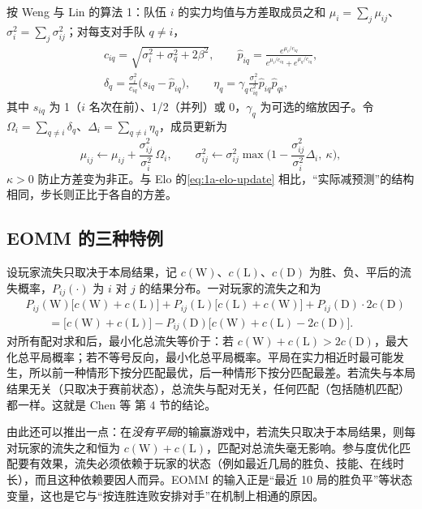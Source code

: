 按 Weng 与 Lin 的算法 1\cite{weng2011bayesian}：队伍 $i$ 的实力均值与方差取成员之和 $\mu_i=\sum_j\mu_{ij}$、$\sigma_i^2=\sum_j\sigma_{ij}^2$；对每支对手队 $q\ne i$，
\begin{gather*}
  c_{iq}=\sqrt{\sigma_i^2+\sigma_q^2+2\beta^2},\qquad
  \hat p_{iq}=\frac{e^{\mu_i/c_{iq}}}{e^{\mu_i/c_{iq}}+e^{\mu_q/c_{iq}}},\\
  \delta_q=\frac{\sigma_i^2}{c_{iq}}\big(s_{iq}-\hat p_{iq}\big),\qquad
  \eta_q=\gamma_q\frac{\sigma_i^2}{c_{iq}^2}\hat p_{iq}\hat p_{qi},
\end{gather*}
其中 $s_{iq}$ 为 1（$i$ 名次在前）、1/2（并列）或 0，$\gamma_q$ 为可选的缩放因子。令 $\Omega_i=\sum_{q\ne i}\delta_q$、$\Delta_i=\sum_{q\ne i}\eta_q$，成员更新为
\[
  \mu_{ij}\leftarrow\mu_{ij}+\frac{\sigma_{ij}^2}{\sigma_i^2}\,\Omega_i,\qquad
  \sigma_{ij}^2\leftarrow\sigma_{ij}^2\max\!\Big(1-\frac{\sigma_{ij}^2}{\sigma_i^2}\Delta_i,\ \kappa\Big),
\]
$\kappa>0$ 防止方差变为非正。与 Elo 的\cref{eq:1a-elo-update} 相比，“实际减预测”的结构相同，步长则正比于各自的方差。

\subsection{EOMM 的三种特例}\label{app:ch1a-eomm}

设玩家流失只取决于本局结果，记 $c(\mathrm W)$、$c(\mathrm L)$、$c(\mathrm D)$ 为胜、负、平后的流失概率，$P_{ij}(\cdot)$ 为 $i$ 对 $j$ 的结果分布。一对玩家的流失之和为
\begin{align*}
  &P_{ij}(\mathrm W)\big[c(\mathrm W)+c(\mathrm L)\big]+P_{ij}(\mathrm L)\big[c(\mathrm L)+c(\mathrm W)\big]+P_{ij}(\mathrm D)\cdot 2c(\mathrm D)\\
  &\qquad=\big[c(\mathrm W)+c(\mathrm L)\big]-P_{ij}(\mathrm D)\big[c(\mathrm W)+c(\mathrm L)-2c(\mathrm D)\big].
\end{align*}
对所有配对求和后，最小化总流失等价于：若 $c(\mathrm W)+c(\mathrm L)>2c(\mathrm D)$，最大化总平局概率；若不等号反向，最小化总平局概率。平局在实力相近时最可能发生，所以前一种情形下按分匹配最优，后一种情形下按分匹配最差。若流失与本局结果无关（只取决于赛前状态），总流失与配对无关，任何匹配（包括随机匹配）都一样。这就是 Chen 等\cite{chen2017eomm} 第 4 节的结论。

由此还可以推出一点\tagOwn：在\emph{没有平局}的输赢游戏中，若流失只取决于本局结果，则每对玩家的流失之和恒为 $c(\mathrm W)+c(\mathrm L)$，匹配对总流失毫无影响。参与度优化匹配要有效果，流失必须依赖于玩家的状态（例如最近几局的胜负、技能、在线时长），而且这种依赖要因人而异。EOMM 的输入正是“最近 10 局的胜负平”等状态变量，这也是它与“按连胜连败安排对手”在机制上相通的原因。

